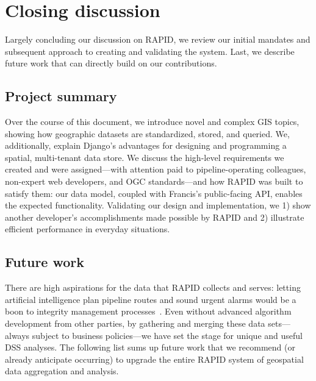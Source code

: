 \chapter{Closing discussion}
\label{conclusions}

Largely concluding our discussion on RAPID, we review our initial mandates and subsequent approach to creating and validating the system. Last, we describe future work that can directly build on our contributions.

\section{Project summary}
Over the course of this document, we introduce novel and complex GIS topics, showing how geographic datasets are standardized, stored, and queried. We, additionally, explain Django's advantages for designing and programming a spatial, multi-tenant data store. We discuss the high-level requirements we created and were assigned---with attention paid to pipeline-operating colleagues, non-expert web developers, and OGC standards---and how RAPID was built to satisfy them: our data model, coupled with Francis's public-facing API, enables the expected functionality. Validating our design and implementation, we 1) show another developer's accomplishments made possible by RAPID and 2) illustrate efficient performance in everyday situations.

\section{Future work}
There are high aspirations for the data that RAPID collects and serves: letting artificial intelligence plan pipeline routes and sound urgent alarms would be a boon to integrity management processes~\cite{Dunning2013}. Even without advanced algorithm development from other parties, by gathering and merging these data sets---always subject to business policies---we have set the stage for unique and useful DSS analyses. The following list sums up future work that we recommend (or already anticipate occurring) to upgrade the entire RAPID system of geospatial data aggregation and analysis.

